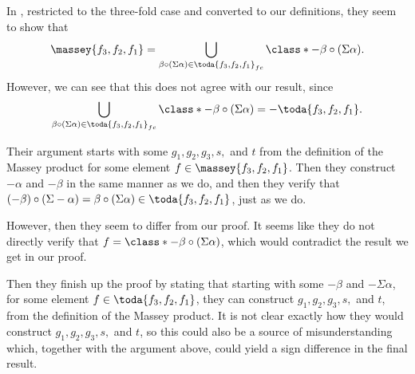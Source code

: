 \begin{remark}
    In \cite[Proposition 4.2.8]{Jasso-Muro_2023}, restricted to the three-fold case and converted to our definitions, they seem to show that
    \[
        \massey{f_3, f_2, f_1} = \bigcup_{\beta \circ (\Sigma \alpha) \in \toda{f_3, f_2, f_1}_{fc}}  \class*{- \beta \circ (\Sigma \alpha)}.
    \]
    However, we can see that this does not agree with our result, since
    \[
        \bigcup_{\beta \circ (\Sigma \alpha) \in \toda{f_3, f_2, f_1}_{fc}}  \class*{- \beta \circ (\Sigma \alpha)} = -\toda{f_3, f_2, f_1}.
    \]

    Their argument starts with some \( g_1, g_2, g_3, s, \) and \( t \) from the definition of the Massey product for some element \( f \in \massey{f_3, f_2, f_1} \). Then they construct \( -\alpha \) and \( -\beta \) in the same manner as we do, and then they verify that \( (-\beta) \circ (\Sigma -\alpha) = \beta \circ (\Sigma \alpha) \in \toda{f_3, f_2, f_1} \), just as we do.

    However, then they seem to differ from our proof. It seems like they do not directly verify that \( f = \class*{- \beta \circ (\Sigma \alpha)} \), which would contradict the result we get in our proof.

    Then they finish up the proof by stating that starting with some \( -\beta \) and \( -\Sigma \alpha \), for some element \( f \in \toda{f_3, f_2, f_1} \), they can construct \( g_1, g_2, g_3, s, \) and \( t \), from the definition of the Massey product. It is not clear exactly how they would construct \( g_1, g_2, g_3, s, \) and \( t \), so this could also be a source of misunderstanding which, together with the argument above, could yield a sign difference in the final result.
\end{remark}